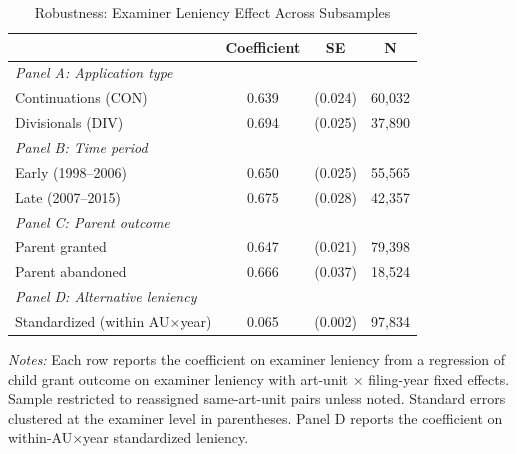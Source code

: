 \begin{table}[t]
\centering
\caption{Robustness: Examiner Leniency Effect Across Subsamples}
\label{tab:robust}
\begin{tabular}{lccc}
\hline\hline
 & Coefficient & SE & N \\
\hline
\textit{Panel A: Application type} & & & \\
Continuations (CON) & 0.639 & (0.024) & 60,032 \\
Divisionals (DIV) & 0.694 & (0.025) & 37,890 \\
\hline
\textit{Panel B: Time period} & & & \\
Early (1998--2006) & 0.650 & (0.025) & 55,565 \\
Late (2007--2015) & 0.675 & (0.028) & 42,357 \\
\hline
\textit{Panel C: Parent outcome} & & & \\
Parent granted & 0.647 & (0.021) & 79,398 \\
Parent abandoned & 0.666 & (0.037) & 18,524 \\
\hline
\textit{Panel D: Alternative leniency} & & & \\
Standardized (within AU$\times$year) & 0.065 & (0.002) & 97,834 \\
\hline\hline
\end{tabular}
\begin{tablenotes}[flushleft]
\small
\item \textit{Notes:} Each row reports the coefficient on examiner leniency from a regression of child grant outcome on examiner leniency with art-unit $\times$ filing-year fixed effects. Sample restricted to reassigned same-art-unit pairs unless noted. Standard errors clustered at the examiner level in parentheses. Panel D reports the coefficient on within-AU$\times$year standardized leniency.
\end{tablenotes}
\end{table}
